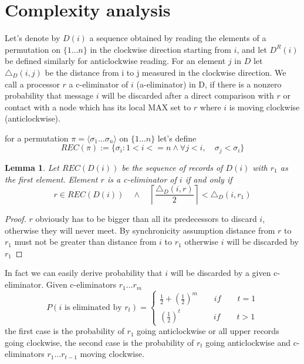 \documentclass[a4paper,12pt]{article}
\newtheorem{lemma}{Lemma}
\begin{document}
\section{Complexity analysis}
Let's denote by $D(i)$ a sequence obtained by reading the elements of a permutation on ${\{1\dots n\}}$ in the clockwise direction starting from $i$, and let $D^R(i)$ be defined similarly for anticlockwise reading. For an element $j$ in $D$ let $\triangle_D(i,j)$  be the distance from i to j measured in the clockwise direction. We call a processor $r$ a c-eliminator of $i$ (a-eliminator) in D, if there is a nonzero probability that message $i$ will be discarded after a direct comparison with $r$ or contact with a node which has its local MAX set to $r$ where $i$ is moving clockwise (anticlockwise).

for a permutation $\pi= \langle \sigma_1 \dots \sigma_n \rangle$  on ${\{1\dots n\}}$ let's define \[REC(\pi):=\{\sigma_i : 1<i<=n \land \forall j<i, \quad \sigma_j<\sigma_i\}\]
\begin{lemma}
Let $REC(D(i))$ be the sequence of records of $D(i)$ with $r_1$ as the first element. Element $r$ is a c-eliminator of $i$ if and only if
\[r \in REC(D(i)) \quad \land \quad \left \lceil \frac{\triangle_D(i,r)}{2} \right \rceil < \triangle_D(i,r_1) \]
\end{lemma}
\begin{proof}
$r$ obviously has to be bigger than all its predecessors to discard $i$, otherwise they will never meet. By synchronicity assumption distance from $r$ to $r_1$ must not be greater than distance from $i$ to $r_1$ otherwise $i$ will be discarded by $r_1$
\end{proof}
In fact we can easily derive probability that $i$ will be discarded by a given c-eliminator. Given c-eliminators $r_1 \dots r_m$ 
$$
P(i\text{ is eliminated by }r_t) =
\begin{cases}
\frac{1}{2}+(\frac{1}{2})^m \qquad  if \qquad t=1\\
(\frac{1}{2})^t \qquad \qquad if \qquad t>1
\end{cases}
$$
the first case is the probability of  $r_1$ going anticlockwise or all upper records going clockwise, the second case is the probability of $r_t$ going anticlockwise and c-eliminators $r_1 \dots r_{t-1}$ moving clockwise.
\end{document}
